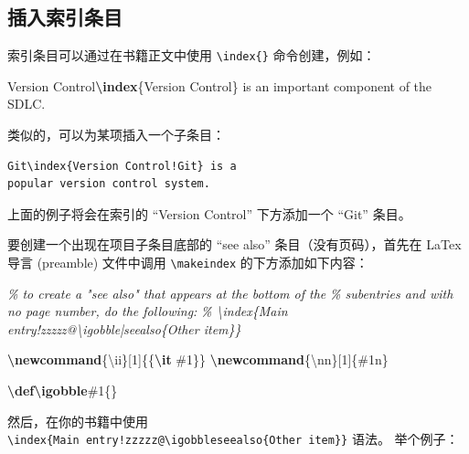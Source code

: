 \documentclass[
  12pt,
]{krantz}
\newenvironment{Shaded}{\begin{snugshade}}{\end{snugshade}}
\newcommand{\CommentTok}[1]{\textcolor[rgb]{0.56,0.35,0.01}{\textit{#1}}}
\newcommand{\ExtensionTok}[1]{#1}
\newcommand{\FunctionTok}[1]{\textcolor[rgb]{0.13,0.29,0.53}{\textbf{#1}}}
\newcommand{\NormalTok}[1]{#1}
\theoremstyle{definition}
\theoremstyle{definition}
\theoremstyle{definition}
\theoremstyle{definition}
\theoremstyle{remark}
\begin{document}
\hypertarget{ux63d2ux5165ux7d22ux5f15ux6761ux76ee}{%
\subsection{插入索引条目}\label{ux63d2ux5165ux7d22ux5f15ux6761ux76ee}}

索引条目可以通过在书籍正文中使用 \texttt{\textbackslash{}index\{\}} 命令创建，例如：

\begin{Shaded}
\begin{Highlighting}[]
\NormalTok{Version Control}\FunctionTok{\textbackslash{}index}\NormalTok{\{Version Control\} is an}
\NormalTok{important component of the SDLC.}
\end{Highlighting}
\end{Shaded}

类似的，可以为某项插入一个子条目：

\begin{verbatim}
Git\index{Version Control!Git} is a
popular version control system.
\end{verbatim}

上面的例子将会在索引的 ``Version Control'' 下方添加一个 ``Git'' 条目。

要创建一个出现在项目子条目底部的 ``see also'' 条目（没有页码），首先在 LaTex 导言 (preamble) 文件中调用 \texttt{\textbackslash{}makeindex} 的下方添加如下内容：

\begin{Shaded}
\begin{Highlighting}[]
\CommentTok{\% to create a "see also" that appears at the bottom of the}
\CommentTok{\% subentries and with no page number, do the following:}
\CommentTok{\% \textbackslash{}index\{Main entry!zzzzz@\textbackslash{}igobble|seealso\{Other item\}\}}

\FunctionTok{\textbackslash{}newcommand}\NormalTok{\{}\ExtensionTok{\textbackslash{}ii}\NormalTok{\}[1]\{\{}\FunctionTok{\textbackslash{}it}\NormalTok{ \#1\}\}}
\FunctionTok{\textbackslash{}newcommand}\NormalTok{\{}\ExtensionTok{\textbackslash{}nn}\NormalTok{\}[1]\{\#1n\}}

\FunctionTok{\textbackslash{}def\textbackslash{}igobble}\NormalTok{\#1\{\}}
\end{Highlighting}
\end{Shaded}

然后，在你的书籍中使用 \texttt{\textbackslash{}index\{Main\ entry!zzzzz@\textbackslash{}igobble\textbar{}seealso\{Other\ item\}\}} 语法。 举个例子：
\end{document}

